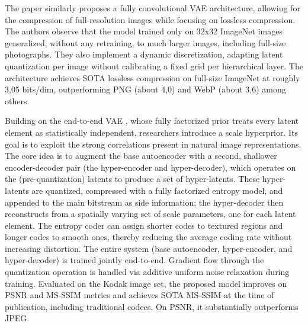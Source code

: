 \documentclass[conference]{IEEEtran}
\begin{document}
The paper \cite{townsend_hilloc_2019} similarly proposes a fully convolutional VAE architecture, allowing for the compression of full-resolution images while focusing on lossless compression. The authors observe that the model trained only on 32x32 ImageNet images generalized, without any retraining, to much larger images, including full-size photographs. They also implement a dynamic discretization, adapting latent quantization per image without calibrating a fixed grid per hierarchical layer. The architecture achieves SOTA lossless compression on full-size ImageNet at roughly 3,05 bits/dim, outperforming PNG (about 4,0) and WebP (about 3,6) among others.


Building on the end-to-end VAE \cite{balle_end--end_2017}, whose fully factorized prior treats every latent element as statistically independent, researchers \cite{balle_variational_2018} introduce a scale hyperprior. Its goal is to exploit the strong correlations present in natural image representations. The core idea is to augment the base autoencoder with a second, shallower encoder-decoder pair (the hyper-encoder and hyper-decoder), which operates on the (pre-quantization) latents to produce a set of hyper-latents. These hyper-latents are quantized, compressed with a fully factorized entropy model, and appended to the main bitstream as side information; the hyper-decoder then reconstructs from a spatially varying set of scale parameters, one for each latent element. The entropy coder can assign shorter codes to textured regions and longer codes to smooth ones, thereby reducing the average coding rate without increasing distortion. The entire system (base autoencoder, hyper-encoder, and hyper-decoder) is trained jointly end-to-end. Gradient flow through the quantization operation is handled via additive uniform noise relaxation during training. Evaluated on the Kodak image set, the proposed model improves on PSNR and MS-SSIM metrics and achieves SOTA MS-SSIM at the time of publication, including traditional codecs. On PSNR, it substantially outperforms JPEG.
\end{document}
